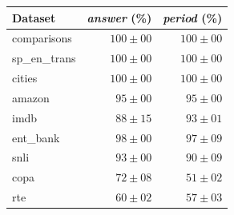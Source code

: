     \begin{tabular}{lrr}
        \toprule
        Dataset         &\textit{answer} (\%)&\textit{period} (\%) \\
        \midrule
        comparisons     & $100 \pm 00$ & $100 \pm 00$ \\
        sp\_en\_trans   & $100 \pm 00$ & $100 \pm 00$ \\
        cities          & $100 \pm 00$ & $100 \pm 00$ \\
        amazon          & $ 95 \pm 00$ & $ 95 \pm 00$ \\
        imdb            & $ 88 \pm 15$ & $ 93 \pm 01$ \\
        ent\_bank       & $ 98 \pm 00$ & $ 97 \pm 09$ \\
        snli            & $ 93 \pm 00$ & $ 90 \pm 09$ \\
        copa            & $ 72 \pm 08$ & $ 51 \pm 02$ \\
        rte             & $ 60 \pm 02$ & $ 57 \pm 03$ \\
        \bottomrule
    \end{tabular}
